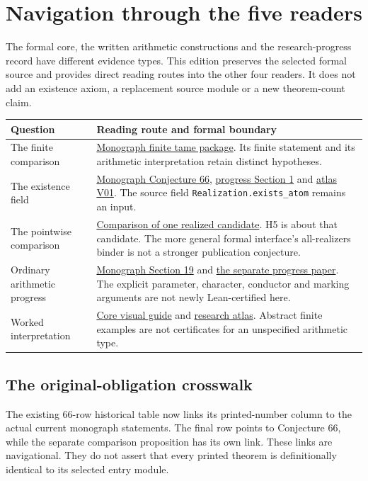 \clearpage
\section*{Navigation through the five readers}
{}
The formal core, the written arithmetic constructions and the research-progress record have different evidence types. This edition preserves the selected formal source and provides direct reading routes into the other four readers. It does not add an existence axiom, a replacement source module or a new theorem-count claim.

\begin{tabular}{@{}>{\raggedright\arraybackslash}p{.29\linewidth}>{\raggedright\arraybackslash}p{.66\linewidth}@{}}\toprule
Question & Reading route and formal boundary\\\midrule
The finite comparison & \href{https://komorebi.invalid/b07/lean_finite}{Monograph finite tame package}. Its finite statement and its arithmetic interpretation retain distinct hypotheses.\\[9pt]
The existence field & \href{https://komorebi.invalid/b07/lean_contract}{Monograph Conjecture 66}, \href{https://komorebi.invalid/b07/lean_research_contract}{progress Section 1} and \href{https://komorebi.invalid/b07/lean_v01}{atlas V01}. The source field \texttt{Realization.exists\_atom} remains an input.\\[9pt]
The pointwise comparison & \href{https://komorebi.invalid/b07/lean_comparison}{Comparison of one realized candidate}. H5 is about that candidate. The more general formal interface's all-realizers binder is not a stronger publication conjecture.\\[9pt]
Ordinary arithmetic progress & \href{https://komorebi.invalid/b07/lean_arithmetic}{Monograph Section 19} and \href{https://komorebi.invalid/b07/lean_progress}{the separate progress paper}. The explicit parameter, character, conductor and marking arguments are not newly Lean-certified here.\\[9pt]
Worked interpretation & \href{https://komorebi.invalid/b07/lean_core_visual}{Core visual guide} and \href{https://komorebi.invalid/b07/lean_atlas}{research atlas}. Abstract finite examples are not certificates for an unspecified arithmetic type.\\\bottomrule
\end{tabular}

\subsection*{The original-obligation crosswalk}
The existing 66-row historical table now links its printed-number column to the actual current monograph statements. The final row points to Conjecture 66, while the separate comparison proposition has its own link. These links are navigational. They do not assert that every printed theorem is definitionally identical to its selected entry module.

